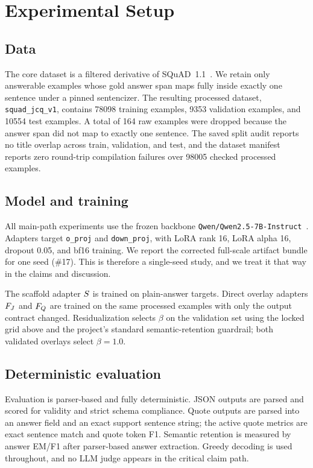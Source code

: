 
\section{Experimental Setup}
\label{sec:setup}

\subsection{Data}

The core dataset is a filtered derivative of SQuAD~1.1~\citep{rajpurkar2016squad}. We retain only answerable examples whose gold answer span maps fully inside exactly one sentence under a pinned sentencizer. The resulting processed dataset, \texttt{squad\_jcq\_v1}, contains \num{78098} training examples, \num{9353} validation examples, and \num{10554} test examples. A total of \num{164} raw examples were dropped because the answer span did not map to exactly one sentence. The saved split audit reports no title overlap across train, validation, and test, and the dataset manifest reports zero round-trip compilation failures over \num{98005} checked processed examples.

\subsection{Model and training}

All main-path experiments use the frozen backbone \texttt{Qwen/Qwen2.5-7B-Instruct}~\citep{yang2024qwen25}. Adapters target \texttt{o\_proj} and \texttt{down\_proj}, with LoRA rank \num{16}, LoRA alpha \num{16}, dropout \num{0.05}, and bf16 training. We report the corrected full-scale artifact bundle for one seed (\#17). This is therefore a single-seed study, and we treat it that way in the claims and discussion.

The scaffold adapter $S$ is trained on plain-answer targets. Direct overlay adapters $F_{J}$ and $F_{Q}$ are trained on the same processed examples with only the output contract changed. Residualization selects $\beta$ on the validation set using the locked grid above and the project's standard semantic-retention guardrail; both validated overlays select $\beta=1.0$.

\subsection{Deterministic evaluation}

Evaluation is parser-based and fully deterministic. JSON outputs are parsed and scored for validity and strict schema compliance. Quote outputs are parsed into an answer field and an exact support sentence string; the active quote metrics are exact sentence match and quote token F1. Semantic retention is measured by answer EM/F1 after parser-based answer extraction. Greedy decoding is used throughout, and no LLM judge appears in the critical claim path.

